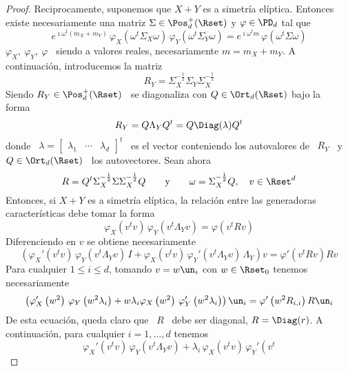 \begin{proof}
  Reciprocamente,  suponemos que  $X+Y$  es a  simetr\'ia el\'iptica.   Entonces
  existe necesariamente  una matriz $\Sigma \in \Pos_d^+(\Rset)$  y $\varphi \in
  \PD_d$ tal que
  \[
  e^{\imath  \omega^t   (m_X  +  m_Y)}  \,   \varphi_X\left(  \omega^t  \Sigma_X
    \omega\right) \, \varphi_Y\left( \omega^t \Sigma_Y \omega\right) = e^{\imath
    \omega^t m} \, \varphi\left( \omega^t \Sigma \omega\right)
  \]
  $\varphi_X,   \:  \varphi_Y,   \:  \varphi$   \  siendo   a   valores  reales,
  necesariamente $m = m_X + m_Y$. A continuaci\'on, introducemos la matriz
  \[
  R_Y  = \Sigma_X^{-\frac12} \Sigma_Y  \Sigma_X^{-\frac12}
  \]
  Siendo $R_Y  \in \Pos_d^+(\Rset)$ \  se diagonaliza con $Q  \in \Ort_d(\Rset)$
  bajo la forma~\cite{Bha97, Bha07, HorJoh13}
  \[
  R_Y = Q \Lambda_Y Q^t = Q \Diag(\lambda) Q^t
  \]
  donde    \    $\lambda    =    \begin{bmatrix}   \lambda_1    &    \cdots    &
    \lambda_d \end{bmatrix}^t$ \  es el vector conteniendo los  autovalores de \
  $R_Y$ \ y \ $Q \in \Ort_d(\Rset)$ \ los autovectores. Sean ahora
  \[
  R  =  Q^t \Sigma_X^{-\frac12}  \Sigma  \Sigma_X^{-\frac12}  Q \qquad  \mbox{y}
  \qquad \omega = \Sigma_X^{-\frac12} Q, \quad v \in \Rset^d
  \]
  Entonces,  si  $X+Y$ es  a  simetr\'ia  el\'iptica,  la relaci\'on  entre  las
  generadoras caracter\'isticas debe tomar la forma
  \[
  \varphi_X\left( v^t  v \right)  \, \varphi_Y\left( v^t  \Lambda_Y v  \right) =
  \varphi\left( v^t R v \right)
  \]
  Diferenciendo en $v$ se obtiene necesariamente
  \[
  \left( \varphi_X'\left( v^t v  \right) \, \varphi_Y\left( v^t \Lambda_Y v
    \right) \,  I + \varphi_X\left(  v^t v \right) \,  \varphi_Y'\left( v^t
      \Lambda_Y  v \right)  \,  \Lambda_Y \right)  v  = \varphi'\left(  v^t R  v
  \right) R v
  \]
  Para cualquier  $1 \le i  \le d$, tomando  $v = w  \un_i$ con $w  \in \Rset_0$
  tenemos necesariamente
  \[
  \left( \varphi_X'\left( w^2 \right) \, \varphi_Y\left( w^2 \lambda_i \right) +
    w \lambda_i  \varphi_X\left( w^2  \right) \, \varphi_Y'\left(  w^2 \lambda_i
    \right) \right) \un_i = \varphi'\left( w^2 R_{i,i} \right) R \un_i
  \]
  De esta ecuaci\'on, queda claro que \ $R$ \ debe ser diagonal, $R = \Diag(r)$.
  A continuaci\'on, para cualquier $i = 1 , \ldots , d$ tenemos
  \[
  \varphi_X'\left( v^t v \right) \, \varphi_Y\left( v^t \Lambda_Y v \right)
  +  \lambda_i \,  \varphi_X\left( v^t  v \right)  \,  \varphi_Y'\left( v^t
\]
\end{proof}
